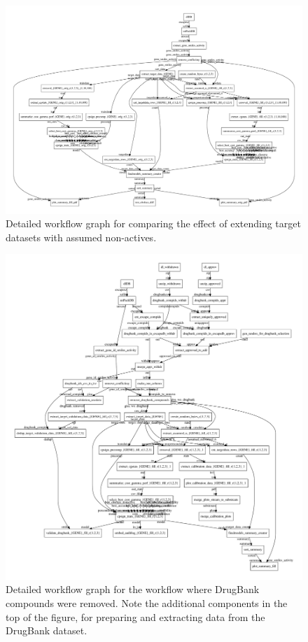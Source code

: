 \documentclass[utf8]{frontiersSCNS} %
\begin{document}
\begin{figure}[h!]
\includegraphics[width=\textwidth]{figures/workflow_graph_fillup_vs_not.pdf}
    \caption{Detailed workflow graph for comparing the effect of extending
    target datasets with assumed non-actives.}
    \label{fig:workflow_detailed_fillup_vs_not}
\end{figure}

\begin{figure}[h!]
\includegraphics[width=\textwidth]{figures/workflow_graph_wo_drugbank.pdf}
    \caption{Detailed workflow graph for the workflow where DrugBank compounds
    were removed. Note the additional components in the top of the figure, for
    preparing and extracting data from the DrugBank dataset.}
    \label{fig:workflow_detailed_wo_drugbank}
\end{figure}
\end{document}
